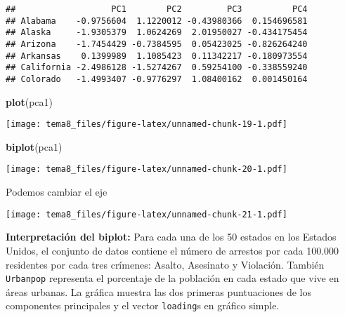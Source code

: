 \documentclass[]{article}
\newenvironment{Shaded}{\begin{snugshade}}{\end{snugshade}}
\newcommand{\KeywordTok}[1]{\textcolor[rgb]{0.13,0.29,0.53}{\textbf{{#1}}}}
\newcommand{\DataTypeTok}[1]{\textcolor[rgb]{0.13,0.29,0.53}{{#1}}}
\newcommand{\DecValTok}[1]{\textcolor[rgb]{0.00,0.00,0.81}{{#1}}}
\newcommand{\StringTok}[1]{\textcolor[rgb]{0.31,0.60,0.02}{{#1}}}
\newcommand{\NormalTok}[1]{{#1}}
\numberwithin{equation}{section}
\begin{document}
\begin{verbatim}
##                   PC1        PC2         PC3          PC4
## Alabama    -0.9756604  1.1220012 -0.43980366  0.154696581
## Alaska     -1.9305379  1.0624269  2.01950027 -0.434175454
## Arizona    -1.7454429 -0.7384595  0.05423025 -0.826264240
## Arkansas    0.1399989  1.1085423  0.11342217 -0.180973554
## California -2.4986128 -1.5274267  0.59254100 -0.338559240
## Colorado   -1.4993407 -0.9776297  1.08400162  0.001450164
\end{verbatim}

\begin{Shaded}
\begin{Highlighting}[]
\KeywordTok{plot}\NormalTok{(pca1)}
\end{Highlighting}
\end{Shaded}

\texttt{[image: tema8\_files/figure-latex/unnamed-chunk-19-1.pdf]}

\begin{Shaded}
\begin{Highlighting}[]
\KeywordTok{biplot}\NormalTok{(pca1)}
\end{Highlighting}
\end{Shaded}

\texttt{[image: tema8\_files/figure-latex/unnamed-chunk-20-1.pdf]}

Podemos cambiar el eje

\begin{Shaded}
\end{Shaded}

\texttt{[image: tema8\_files/figure-latex/unnamed-chunk-21-1.pdf]}

\textbf{Interpretación del biplot:} Para cada una de los 50 estados en
los Estados Unidos, el conjunto de datos contiene el número de arrestos
por cada 100.000 residentes por cada tres crímenes: Asalto, Asesinato y
Violación. También \texttt{Urbanpop} representa el porcentaje de la
población en cada estado que vive en áreas urbanas. La gráfica muestra
las dos primeras puntuaciones de los componentes principales y el vector
\texttt{loading}s en gráfico simple.
\end{document}
